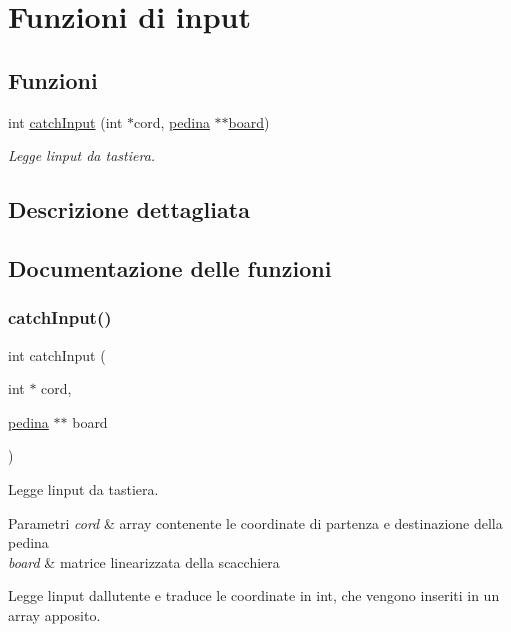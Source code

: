 \hypertarget{group__Input}{}\section{Funzioni di input}
\label{group__Input}
\subsection*{Funzioni}
\begin{DoxyCompactItemize}
\item 
int \hyperlink{group__Input_gaf824dd8c8d8c26d7596de5b635b554e7}{catch\+Input} (int $\ast$cord, \hyperlink{ml__lib_8h_a71fee95122b31f5cb0b07d9c16ffa3a5}{pedina} $\ast$$\ast$\hyperlink{ml__main_8c_a62a3fe3d1df9ff58883b669f7f24e516}{board})
\begin{DoxyCompactList}\small\item\em Legge l\textquotesingle{}input da tastiera. \end{DoxyCompactList}\end{DoxyCompactItemize}


\subsection{Descrizione dettagliata}


\subsection{Documentazione delle funzioni}
\mbox{\label{group__Input_gaf824dd8c8d8c26d7596de5b635b554e7}} 
\subsubsection{\texorpdfstring{catch\+Input()}{catchInput()}}
{\footnotesize\ttfamily int catch\+Input (\begin{DoxyParamCaption}\item[{int $\ast$}]{cord,  }\item[{\hyperlink{ml__lib_8h_a71fee95122b31f5cb0b07d9c16ffa3a5}{pedina} $\ast$$\ast$}]{board }\end{DoxyParamCaption})}



Legge l\textquotesingle{}input da tastiera. 


\begin{DoxyParams}{Parametri}
{\em cord} & array contenente le coordinate di partenza e destinazione della pedina \\
\hline
{\em board} & matrice linearizzata della scacchiera\\
\hline
\end{DoxyParams}
Legge l\textquotesingle{}input dall\textquotesingle{}utente e traduce le coordinate in int, che vengono inseriti in un array apposito. 